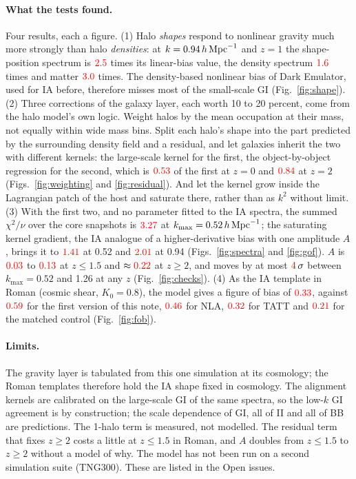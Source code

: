 \documentclass[11pt]{article}
\newcommand{\hMpc}{\,h\,{\rm Mpc}^{-1}}
\newcommand{\kmax}{k_{\max}}
\newif\ifnumbersfinal
\newcommand{\refresh}[1]{\ifnumbersfinal#1\else\textcolor{red}{#1}\fi}
\begin{document}
\paragraph{What the tests found.} Four results, each a figure.
(1) Halo \emph{shapes} respond to nonlinear gravity much more strongly than
halo \emph{densities}: at $k=0.94\hMpc$ and $z=1$ the shape-position
spectrum is $\refresh{\respShape}$ times its linear-bias value, the density
spectrum $\refresh{\respDens}$ times and matter $\refresh{\respMatter}$
times. The density-based nonlinear bias of Dark Emulator, used for IA
before, therefore misses most of the small-scale GI (Fig.~\ref{fig:shape}).
(2) Three corrections of the galaxy layer, each worth 10 to 20 percent,
come from the halo model's own logic. Weight halos by the mean occupation
at their mass, not equally within wide mass bins. Split each halo's shape
into the part predicted by the surrounding density field and a residual,
and let galaxies inherit the two with different kernels: the large-scale
kernel for the first, the object-by-object regression for the second,
which is $\refresh{\krcZero}$ of the first at $z=0$ and
$\refresh{\krcTwo}$ at $z=2$ (Figs.~\ref{fig:weighting} and
\ref{fig:residual}). And let the kernel grow inside the Lagrangian patch
of the host and saturate there, rather than as $k^2$ without limit.
(3) With the first two, and no parameter fitted to the IA spectra, the
summed $\chi^2/\nu$ over the core snapshots is $\refresh{\gofWA}$ at
$\kmax=0.52\hMpc$; the saturating kernel gradient, the IA analogue of a
higher-derivative bias with one amplitude $A$, brings it to
$\refresh{\gofWgA}$ at 0.52 and $\refresh{\gofWgC}$ at 0.94
(Figs.~\ref{fig:spectra} and \ref{fig:gof}). $A$ is
$\refresh{\ALo}$ to $\refresh{\AHi}$ at $z\le1.5$ and
$\approx\refresh{\AHighFit}$ at $z\ge2$, and moves by at most
$\refresh{\AShiftSig}\,\sigma$ between $\kmax=0.52$ and 1.26 at any $z$
(Fig.~\ref{fig:checks}).
(4) As the IA template in Roman (cosmic shear, $K_0=0.8$), the model gives
a figure of bias of $\refresh{\fobCsWgEight}$, against
$\refresh{\fobCsVoneEight}$ for the first version of this note,
$\refresh{\fobCsNlaEight}$ for NLA, $\refresh{\fobCsTattEight}$ for TATT
and $\refresh{\fobCsCtrlEight}$ for the matched control
(Fig.~\ref{fig:fob}).

\paragraph{Limits.} The gravity layer is tabulated from this one
simulation at its cosmology; the Roman templates therefore hold the IA
shape fixed in cosmology. The alignment kernels are calibrated on the
large-scale GI of the same spectra, so the low-$k$ GI agreement is by
construction; the scale dependence of GI, all of II and all of BB are
predictions. The 1-halo term is measured, not modelled. The residual
term that fixes $z\ge2$ costs a little at $z\le1.5$ in Roman, and $A$
doubles from $z\le1.5$ to $z\ge2$ without a model of why. The model has
not been run on a second simulation suite (TNG300). These are listed in
the Open issues.
\end{document}
